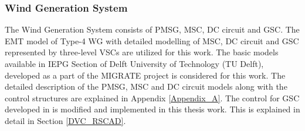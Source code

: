 \subsubsection{Wind Generation System}
The Wind Generation System consists of \gls{PMSG}, \gls{MSC}, \gls{DC} circuit and \gls{GSC}. The \gls{EMT} model of Type-4 \gls{WG} with detailed modelling of \gls{MSC}, \gls{DC} circuit and \gls{GSC} represented by three-level \gls{VSC}s are utilized for this work. The basic models available in IEPG Section of Delft University of Technology (TU Delft), developed as a part of the MIGRATE project \cite{noauthor_migrate_2020} is considered for this work. The detailed description of the \gls{PMSG}, \gls{MSC} and \gls{DC} circuit models along with the control structures are explained in Appendix \ref{Appendix_A}. The control for \gls{GSC} developed in \cite{sethi_real-time_nodate-new} is modified and implemented in this thesis work. This is explained in detail in Section \ref{DVC_RSCAD}.

